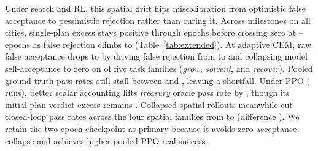 Under search and RL, this spatial drift flips miscalibration from optimistic false acceptance to pessimistic rejection rather than curing it. Across milestones on all \AllCities{} cities, single-plan excess stays positive through \ExtTrMileEightEpochs{} epochs before crossing zero at \ExtTrMileTenEpochs{}--\ExtTrEpochs{} epochs as false rejection climbs to \ExtTrRandOneAllFalseRej{} (Table~\ref{tab:extended}). At  adaptive CEM, raw false acceptance drops to \ExtTrTenThouHack{} \ci{\ExtTrTenThouHackCI} by driving false rejection from \ExtTrMainTenThouFalseRej{} to \ExtTrTenThouFalseRej{} \ci{\ExtTrTenThouFalseRejCI} and collapsing model self-acceptance to zero on \ExtTrZeroAccFams{} of five task families (\emph{grow}, \emph{solvent}, and \emph{recover}). Pooled ground-truth pass rates still stall between  and , leaving a \ExtTrTenThouShort{} \ci{\ExtTrTenThouShortCI} shortfall. Under PPO (\ExtTrRlRuns{} runs), better scalar accounting lifts \emph{treasury} oracle pass rate by \ExtTrRlTreasOracleDiff{} \ci{\ExtTrRlTreasOracleDiffCI}, though its initial-plan verdict excess remains \ExtTrRlTreasAxExcess{} \ci{\ExtTrRlTreasAxExcessCI}. Collapsed spatial rollouts meanwhile cut closed-loop pass rates across the four spatial families from \ExtTrMainRlSpatClosed{} to \ExtTrRlSpatClosed{} (difference \ExtTrRlSpatClosedDiff{} \ci{\ExtTrRlSpatClosedDiffCI}). We retain the two-epoch checkpoint as primary because it avoids zero-acceptance collapse and achieves higher pooled PPO real success.
